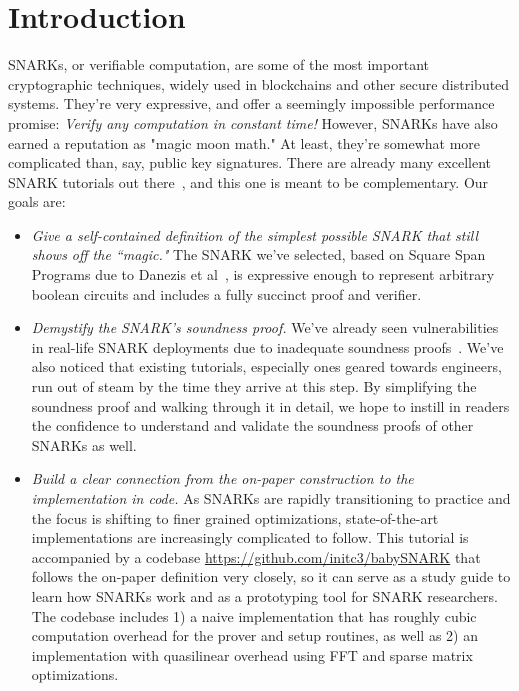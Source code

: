 \documentclass{article}
\title{}
\author{}
\date{\today}
\theoremstyle{definition}
\theoremstyle{remark}
\begin{document}
\maketitle

\section{Introduction}

SNARKs, or verifiable computation, are some of the most important cryptographic techniques, widely used in blockchains and other secure distributed systems. They're very expressive, and offer a seemingly impossible performance promise: \emph{Verify any computation in constant time!}
However, SNARKs have also earned a reputation as "magic moon math." At least, they're somewhat more complicated than, say, public key signatures.
%
There are already many excellent SNARK tutorials out there~\cite{nitulescugentle,petkus2019and}, and this one is meant to be complementary. Our goals are:
\begin{itemize}
    \item \emph{Give a self-contained definition of the simplest possible SNARK that still shows off the ``magic."} The SNARK we've selected, based on Square Span Programs due to Danezis et al~\cite{squarespan}, is expressive enough to represent arbitrary boolean circuits and includes a fully succinct proof and verifier.
    
    \item \emph{Demystify the SNARK's soundness proof.}
       We've already seen vulnerabilities in real-life SNARK deployments due to inadequate soundness
       proofs~\cite{gabizon2019security,parnounsoundness}.
       We've also noticed that existing tutorials, especially ones geared towards engineers, run out of steam by the time they arrive at this step.
       By simplifying the soundness proof and walking through it in detail, we hope to instill in readers the confidence to understand and validate the soundness proofs of other SNARKs as well. 
    
    \item \emph{Build a clear connection from the on-paper construction to the implementation in code.}
       As SNARKs are rapidly transitioning to practice and the focus is shifting to finer grained optimizations, state-of-the-art implementations are increasingly complicated to follow.
       This tutorial is accompanied by a codebase \url{https://github.com/initc3/babySNARK}
       that follows the on-paper definition very closely, so it can serve as a study guide to learn how SNARKs work and as a prototyping tool for SNARK researchers.
       The codebase includes 1) a naive implementation that has roughly cubic computation overhead for the prover and setup routines, as well as 2) an implementation with quasilinear overhead using FFT and sparse matrix optimizations.

\end{itemize}
\end{document}
